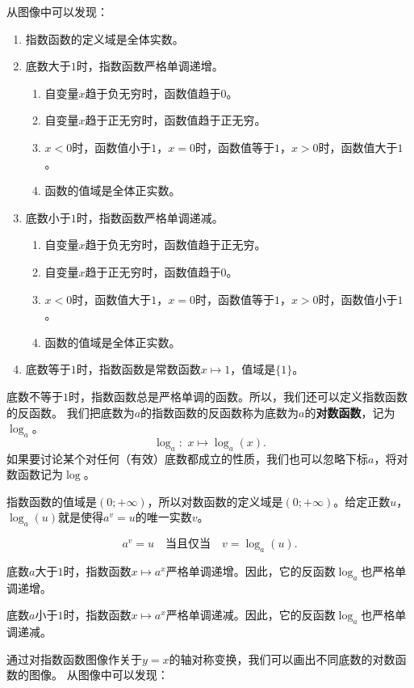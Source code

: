\documentclass[12pt,UTF8,fontset=none]{ctexbook}
\begin{document}
从图像中可以发现：
\begin{enumerate}
    \item 指数函数的定义域是全体实数。
    \item 底数大于$1$时，指数函数严格单调递增。
    \begin{enumerate}[label*=\arabic*.]
        \item 自变量$x$趋于负无穷时，函数值趋于$0$。
        \item 自变量$x$趋于正无穷时，函数值趋于正无穷。
        \item $x < 0$时，函数值小于$1$，$x = 0$时，函数值等于$1$，$x > 0$时，函数值大于$1$。
        \item 函数的值域是全体正实数。
    \end{enumerate}
    \item 底数小于$1$时，指数函数严格单调递减。    
    \begin{enumerate}[label*=\arabic*.]
        \item 自变量$x$趋于负无穷时，函数值趋于正无穷。
        \item 自变量$x$趋于正无穷时，函数值趋于$0$。
        \item $x < 0$时，函数值大于$1$，$x = 0$时，函数值等于$1$，$x > 0$时，函数值小于$1$。
        \item 函数的值域是全体正实数。
    \end{enumerate}
    \item 底数等于$1$时，指数函数是常数函数$x \mapsto 1$，值域是$\{1\}$。
\end{enumerate}

底数不等于$1$时，指数函数总是严格单调的函数。所以，我们还可以定义指数函数的反函数。
我们把底数为$a$的指数函数的反函数称为底数为$a$的\textbf{对数函数}，记为$\log_a$。
$$ \log_a : \,\, x \mapsto \log_a(x). $$
如果要讨论某个对任何（有效）底数都成立的性质，我们也可以忽略下标$a$，将对数函数记为$\log$。

指数函数的值域是$(0;+\infty)$，所以对数函数的定义域是$(0;+\infty)$。给定正数$u$，$\log_a(u)$就是使得$a^v = u$的唯一实数$v$。

$$ a^v = u \quad\mbox{当且仅当} \quad v = \log_a(u). $$

底数$a$大于$1$时，指数函数$x\mapsto a^x$严格单调递增。因此，它的反函数$\log_a$也严格单调递增。

底数$a$小于$1$时，指数函数$x\mapsto a^x$严格单调递减。因此，它的反函数$\log_a$也严格单调递减。

通过对指数函数图像作关于$y = x$的轴对称变换，我们可以画出不同底数的对数函数的图像。
从图像中可以发现：
\end{document}
